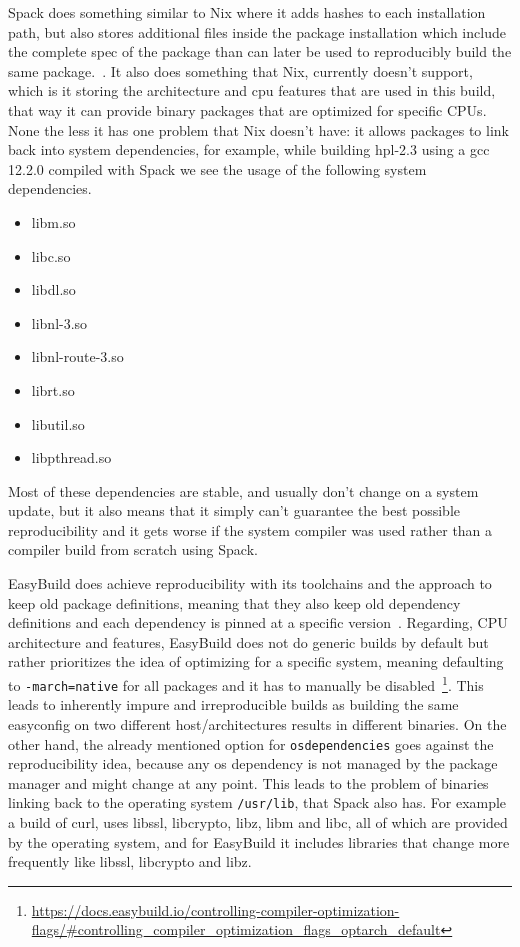 \documentclass[conference,final,a4paper]{IEEEtran}
\begin{document}
Spack does something similar to Nix where it adds hashes to each installation path, but also stores additional files inside the package installation which include the complete spec of the package than can later be used to reproducibly build the same package.~\cite{Gamblin_2015}.
It also does something that Nix, currently doesn't support, which is it storing the architecture and cpu features that are used in this build, that way it can provide binary packages that are optimized for specific CPUs.
None the less it has one problem that Nix doesn't have: it allows packages to link back into system dependencies, for example, while building hpl-2.3 using a gcc 12.2.0 compiled with Spack we see the usage of the following system dependencies.
\begin{itemize}
  \item libm.so
  \item libc.so
  \item libdl.so
  \item libnl-3.so
  \item libnl-route-3.so
  \item librt.so
  \item libutil.so
  \item libpthread.so
\end{itemize}
Most of these dependencies are stable, and usually don't change on a system update, but it also means that it simply can't guarantee the best possible reproducibility and it gets worse if the system compiler was used rather than a compiler build from scratch using Spack.

EasyBuild does achieve reproducibility with its toolchains and the approach to keep old package definitions, meaning that they also keep old dependency definitions and each dependency is pinned at a specific version~\cite{Geimer_2014}.
Regarding, CPU architecture and features, EasyBuild does not do generic builds by default but rather prioritizes the idea of optimizing for a specific system, meaning defaulting to \texttt{-march=native} for all packages and it has to manually be disabled~\footnote{\url{https://docs.easybuild.io/controlling-compiler-optimization-flags/\#controlling\_compiler\_optimization\_flags\_optarch\_default}}.
This leads to inherently impure and irreproducible builds as building the same easyconfig on two different host/architectures results in different binaries.
On the other hand, the already mentioned option for \texttt{osdependencies} goes against the reproducibility idea, because any os dependency is not managed by the package manager and might change at any point.
This leads to the problem of binaries linking back to the operating system \texttt{/usr/lib}, that Spack also has.
For example a build of curl, uses libssl, libcrypto, libz, libm and libc, all of which are provided by the operating system, and for EasyBuild it includes libraries that change more frequently like libssl, libcrypto and libz.\\
\end{document}
